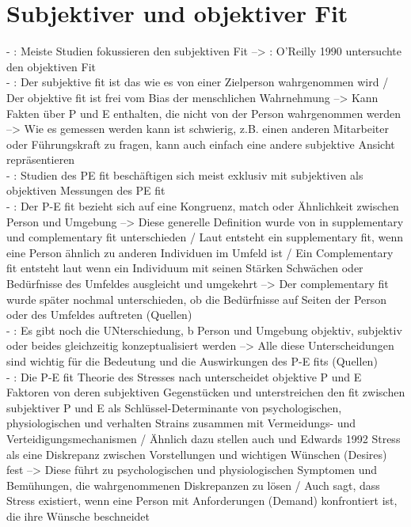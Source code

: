 \section{Subjektiver und objektiver Fit}
\label{ch:personEnvironmentFit:subjektivObjektiv}
- \cite[S. 9]{caplan:1993}: Meiste Studien fokussieren den subjektiven Fit --> \cite[S. 10]{caplan:1993}: O'Reilly 1990 untersuchte den objektiven Fit\\
- \cite[S. 4]{caplan:1987}: Der subjektive fit ist das wie es von einer Zielperson wahrgenommen wird / Der objektive fit ist frei vom Bias der menschlichen Wahrnehmung --> Kann Fakten über P und E enthalten, die nicht von der Person wahrgenommen werden --> Wie es gemessen werden kann ist schwierig, z.B. einen anderen Mitarbeiter oder Führungskraft zu fragen, kann auch einfach eine andere subjektive Ansicht repräsentieren \\
- \cite[S. 8]{caplan:1987}: Studien des PE fit beschäftigen sich meist exklusiv mit subjektiven als objektiven Messungen des PE fit\\
- \cite[S. 4]{edwards:2008}: Der P-E fit bezieht sich auf eine Kongruenz, match oder Ähnlichkeit zwischen Person und Umgebung --> Diese generelle Definition wurde von \textcite{muchinsky:1987} in supplementary und complementary fit unterschieden / Laut \cite[S. 269]{muchinsky:1987} entsteht ein supplementary fit, wenn eine Person ähnlich zu anderen Individuen im Umfeld ist / Ein Complementary fit entsteht laut \cite[S. 271]{muchinsky:1987} wenn ein Individuum mit seinen Stärken Schwächen oder Bedürfnisse des Umfeldes ausgleicht und umgekehrt --> Der complementary fit wurde später nochmal unterschieden, ob die Bedürfnisse auf Seiten der Person oder des Umfeldes auftreten (Quellen) \\
- \cite[S. 5]{edwards:2008}: Es gibt noch die UNterschiedung, b Person und Umgebung objektiv, subjektiv oder beides gleichzeitig konzeptualisiert werden --> Alle diese Unterscheidungen sind wichtig für die Bedeutung und die Auswirkungen des P-E fits (Quellen) \\
- \cite[S. 4]{edwards:2017}: Die P-E fit Theorie des Stresses nach \cite{mechanismsOfJobStressAndStrain:1982} unterscheidet objektive P und E Faktoren von deren subjektiven Gegenstücken und unterstreichen den fit zwischen subjektiver P und E als Schlüssel-Determinante von psychologischen, physiologischen und verhalten Strains zusammen mit Vermeidungs- und Verteidigungsmechanismen / Ähnlich dazu stellen auch \cite{cummings:1979} und Edwards 1992 Stress als eine Diskrepanz zwischen Vorstellungen und wichtigen Wünschen (Desires) fest --> Diese führt zu psychologischen und physiologischen Symptomen und Bemühungen, die wahrgenommenen Diskrepanzen zu lösen / Auch \cite{schuler:1980} sagt, dass Stress existiert, wenn eine Person mit Anforderungen (Demand) konfrontiert ist, die ihre Wünsche beschneidet\\
